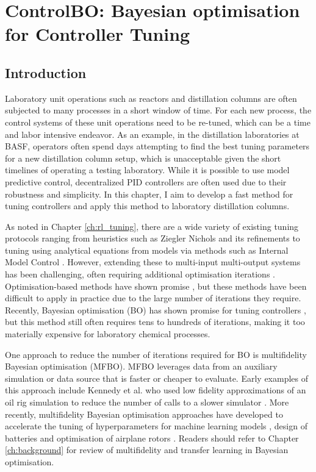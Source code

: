 \chapter{ControlBO: Bayesian optimisation for Controller Tuning}\label{ch:mfbo} 

\section{Introduction}
\label{sec:intro}
Laboratory unit operations such as reactors and distillation columns  are often subjected to many processes in a short window of time. For each new process, the control systems of these unit operations need to be re-tuned, which can be a time and labor intensive endeavor. As an example, in the distillation laboratories at BASF, operators often spend days attempting to find the best tuning parameters for a new distillation column setup, which is unacceptable given the short timelines of operating a testing laboratory. While it is possible to use model predictive control, decentralized PID controllers are often used due to their robustness and simplicity. In this chapter, I aim to develop a fast method for tuning controllers and apply this method to laboratory distillation columns.

As noted in Chapter \ref{ch:rl_tuning}, there are a wide variety of existing tuning protocols ranging from heuristics such as Ziegler Nichols \cite{Ziegler1942} and its refinements \cite{Hang1991} to tuning using analytical equations from models via methods such as  Internal Model Control \cite{Copeland2010}. However, extending these to multi-input multi-output systems has been challenging, often requiring additional optimisation iterations \cite{Nandong2013, Nandong2015}. Optimisation-based methods have shown promise \cite{Pajares2019, Sumana2010, Rajapandiyan2012, Behroozsarand2012}, but these methods have been difficult to apply in practice due to the large number of iterations they require. Recently, Bayesian optimisation (BO) has shown promise for tuning controllers \cite{NeumannBrosig2020, Fiducioso2019, Khosravi2020, Konig2020, Fujimoto2022, Brunzema2022, Khosravi2022}, but this method still often requires tens to hundreds of iterations, making it too materially expensive for laboratory chemical processes.

One approach to reduce the number of iterations required for BO is multifidelity Bayesian optimisation (MFBO). MFBO leverages data from an auxiliary simulation or data source that is faster or cheaper to evaluate. Early examples of this approach include Kennedy et al. who used low fidelity approximations of an oil rig simulation to reduce the number of calls to a slower simulator \cite{Kennedy2000}. More recently, multifidelity Bayesian optimisation approaches have developed to accelerate the tuning of hyperparameters for machine learning models \cite{pmlr-v70-kandasamy17a}, design of batteries \cite{Folch2023} and optimisation of airplane rotors \cite{Pan2017}. Readers should refer to Chapter \ref{ch:background} for review of multifidelity and transfer learning in Bayesian optimisation.

